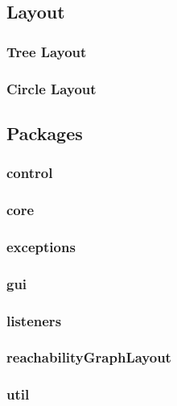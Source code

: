 \documentclass[10pt, a4paper]{article}
\begin{document}
\subsection{Layout}
\label{label:layout}

\subsubsection{Tree Layout}
\label{label:treeLayout}

\subsubsection{Circle Layout}
\label{label:circleLayout}

\subsection{Packages}

\subsubsection{control}

\subsubsection{core}
\subsubsection{exceptions}
\subsubsection{gui}
\subsubsection{listeners}
\subsubsection{reachabilityGraphLayout}
\subsubsection{util}


\newpage









 
%

%
\end{document}
